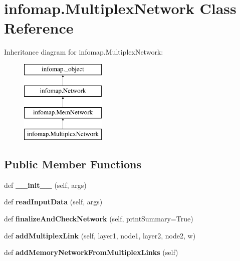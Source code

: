 \hypertarget{classinfomap_1_1MultiplexNetwork}{}\section{infomap.\+Multiplex\+Network Class Reference}
\label{classinfomap_1_1MultiplexNetwork}
Inheritance diagram for infomap.\+Multiplex\+Network\+:\begin{figure}[H]
\begin{center}
\leavevmode
\includegraphics[height=4.000000cm]{classinfomap_1_1MultiplexNetwork}
\end{center}
\end{figure}
\subsection*{Public Member Functions}
\begin{DoxyCompactItemize}
\item 
\mbox{\label{classinfomap_1_1MultiplexNetwork_a9d605db1513e36c20dd122019dc026ba}} 
def {\bfseries \+\_\+\+\_\+init\+\_\+\+\_\+} (self, args)
\item 
\mbox{\label{classinfomap_1_1MultiplexNetwork_aadcebb6b1ad7627f16ae4f1fa904c44f}} 
def {\bfseries read\+Input\+Data} (self, args)
\item 
\mbox{\label{classinfomap_1_1MultiplexNetwork_ac72e3f45401c316f5f782388b55a03a2}} 
def {\bfseries finalize\+And\+Check\+Network} (self, print\+Summary=True)
\item 
\mbox{\label{classinfomap_1_1MultiplexNetwork_a11a3c58b45037a60fe465b2c74651abd}} 
def {\bfseries add\+Multiplex\+Link} (self, layer1, node1, layer2, node2, w)
\item 
\mbox{\label{classinfomap_1_1MultiplexNetwork_abf4cc6e5ef82c06e88cc2d7c12a576be}} 
def {\bfseries add\+Memory\+Network\+From\+Multiplex\+Links} (self)
\end{DoxyCompactItemize}

